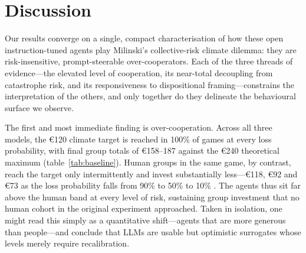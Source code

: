 \documentclass[openacc]{rsproca_new}
\begin{document}


\section{Discussion}

Our results converge on a single, compact characterisation of how these open instruction-tuned agents play Milinski's collective-risk climate dilemma: they are risk-insensitive, prompt-steerable over-cooperators. Each of the three threads of evidence---the elevated level of cooperation, its near-total decoupling from catastrophe risk, and its responsiveness to dispositional framing---constrains the interpretation of the others, and only together do they delineate the behavioural surface we observe.

The first and most immediate finding is over-cooperation. Across all three models, the €120 climate target is reached in 100\% of games at every loss probability, with final group totals of €158--187 against the €240 theoretical maximum (table~\ref{tab:baseline}). Human groups in the same game, by contrast, reach the target only intermittently and invest substantially less---€118, €92 and €73 as the loss probability falls from 90\% to 50\% to 10\% \cite{milinski2008climate}. The agents thus sit far above the human band at every level of risk, sustaining group investment that no human cohort in the original experiment approached. Taken in isolation, one might read this simply as a quantitative shift---agents that are more generous than people---and conclude that LLMs are usable but optimistic surrogates whose levels merely require recalibration.
\end{document}
